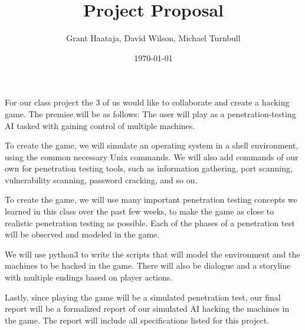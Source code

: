 \documentclass[11pt,final,twoside]{article} %
\title{Project Proposal}
\author{Grant Haataja, David Wilson, Michael Turnbull}
\date{\today}
\begin{document}
	\maketitle
	
For our class project the 3 of us would like to collaborate and create a hacking game. The premise will be as follows: The user will play as a penetration-testing AI tasked with gaining control of multiple machines.

To create the game, we will simulate an operating system in a shell environment, using the common necessary Unix commands. We will also add commands of our own for penetration testing tools, such as information gathering, port scanning, vulnerability scanning, password cracking, and so on.
	
To create the game, we will use many important penetration testing concepts we learned in this class over the past few weeks, to make the game as close to realistic penetration testing as possible. Each of the phases of a penetration test will be observed and modeled in the game.

We will use python3 to write the scripts that will model the environment and the machines to be hacked in the game. There will also be dialogue and a storyline with multiple endings based on player actions. 

Lastly, since playing the game will be a simulated penetration test, our final report will be a formalized report of our simulated AI hacking the machines in the game. The report will include all specifications listed for this project.
\end{document}
